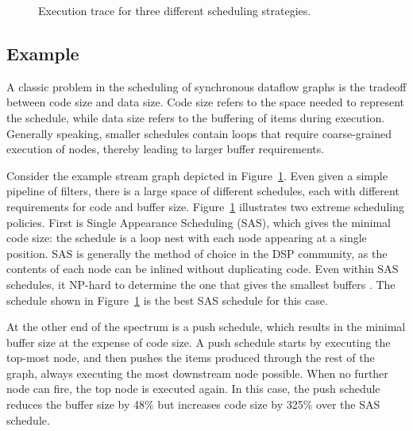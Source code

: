 \begin{figure}[t]
\caption{Execution trace for three different scheduling
strategies.\protect\label{fig:trace}}
\vspace{-12pt}
\end{figure}

\subsection{Example}
\label{sec:sched-vs-buffer}

\begin{comment}
\begin{figure}
\begin{center}
\psfig{figure=pipeline-buffers.eps,width=0.6in} \caption[4 {\filter}
{\pipeline}]{Sample 4 {\filter} {\pipeline}.  This {\pipeline} is
the same as one in Figure \ref{fig:steady-state} (a), except that
its children do not peek extra data} \label{fig:pipeline-buffers}
\end{center}
\end{figure}
\end{comment}

A classic problem in the scheduling of synchronous dataflow graphs is
the tradeoff between code size and data size.  Code size refers to the
space needed to represent the schedule, while data size refers to the
buffering of items during execution.  Generally speaking, smaller
schedules contain loops that require coarse-grained execution of
nodes, thereby leading to larger buffer requirements.

Consider the example stream graph depicted in Figure~\ref{fig:trace}.
Even given a simple pipeline of filters, there is a large space of
different schedules, each with different requirements for code and
buffer size.  Figure~\ref{fig:trace} illustrates two extreme
scheduling policies.  First is Single Appearance Scheduling (SAS),
which gives the minimal code size: the schedule is a loop nest with
each node appearing at a single position.  SAS is generally the method
of choice in the DSP community, as the contents of each node can be
inlined without duplicating code.  Even within SAS schedules, it
NP-hard to determine the one that gives the smallest buffers
.  The schedule shown in Figure~\ref{fig:trace} is the
best SAS schedule for this case.

At the other end of the spectrum is a push schedule, which results in
the minimal buffer size at the expense of code size.  A push schedule
starts by executing the top-most node, and then pushes the items
produced through the rest of the graph, always executing the most
downstream node possible.  When no further node can fire, the top node
is executed again.  In this case, the push schedule reduces the buffer
size by 48\% but increases code size by 325\% over the SAS schedule.

